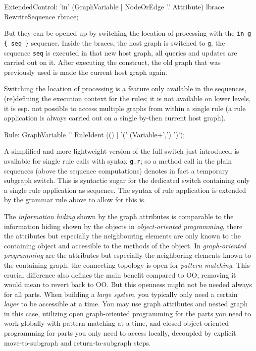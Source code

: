 \begin{rail} 
  ExtendedControl: 
    'in' (GraphVariable | NodeOrEdge '.' Attribute) lbrace RewriteSequence rbrace;
\end{rail}

But they can be opened up by switching the location of processing with the \verb#in g { seq }# sequence.
Inside the braces, the host graph is switched to \texttt{g}, the sequence \texttt{seq} is executed in that new host graph, all queries and updates are carried out on it. 
After executing the construct, the old graph that was previously used is made the current host graph again.

Switching the location of processing is a feature only available in the sequences, (re)defining the execution context for the rules; it is not available on lower levels, it is esp. not possible to access multiple graphs from within a single rule (a rule application is always carried out on a single by-then current host graph).

\begin{rail}
  Rule: GraphVariable '.' RuleIdent (() | '(' (Variable+',') ')');
\end{rail}

A simplified and more lightweight version of the full switch just introduced is available for single rule calls with syntax \verb#g.r#; so a method call in the plain sequences (above the sequence computations) denotes in fact a temporary subgraph switch.
This is syntactic sugar for the dedicated switch containing only a single rule application as sequence.
The syntax of rule application is extended by the grammar rule above to allow for this is.

The \emph{information hiding} shown by the graph attributes is comparable to the information hiding shown by the objects in \emph{object-oriented programming}, there the attributes but especially the neighbouring elements are only known to the containing object and accessible to the methods of the object.
In \emph{graph-oriented programming} are the attributes but especially the neighboring elements known to the containing graph, the connecting topology is open for \emph{pattern matching}.
This crucial difference also defines the main benefit compared to OO, removing it would mean to revert back to OO.
But this openness might not be needed always for all parts.
When building a \emph{large system}, you typically only need a certain \emph{layer} to be accessible at a time.
You may use graph attributes and nested graph in this case,
utilizing open graph-oriented programming for the parts you need to work globally with pattern matching at a time,
and closed object-oriented programming for parts you only need to access locally,
decoupled by explicit move-to-subgraph and return-to-subgraph steps.

